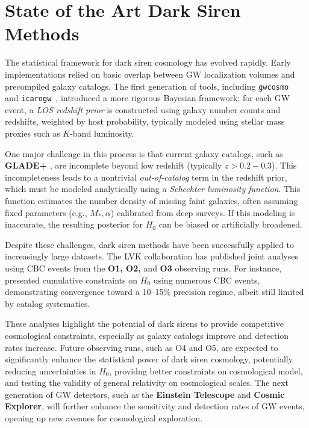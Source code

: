 \section{State of the Art Dark Siren Methods}
The statistical framework for dark siren cosmology has evolved rapidly. Early implementations relied on basic overlap between GW localization volumes and precompiled galaxy catalogs. The first generation of tools, including \texttt{gwcosmo}~\citep{gray2020cosmological, gray2022pixelated, gray2023joint} and \texttt{icarogw}~\citep{mastrogiovanni2021importance, mastrogiovanni2024icarogw}, introduced a more rigorous Bayesian framework: for each \ac{GW} event, a \textit{\ac{LOS} redshift prior} is constructed using galaxy number counts and redshifts, weighted by host probability, typically modeled using stellar mass proxies such as $K$-band luminosity.

One major challenge in this process is that current galaxy catalogs, such as \textbf{GLADE+} \citep{dalya2022glade+}, are incomplete beyond low redshift (typically $ z > 0.2 - 0.3$). This incompleteness leads to a nontrivial \textit{out-of-catalog} term in the redshift prior, which must be modeled analytically using a \textit{Schechter luminosity function}. This function estimates the number density of missing faint galaxies, often assuming fixed parameters (e.g., $M_*,\alpha$) calibrated from deep surveys. If this modeling is inaccurate, the resulting posterior for $H_0$ can be biased or artificially broadened.

Despite these challenges, dark siren methods have been successfully applied to increasingly large datasets. The \ac{LVK} collaboration has published joint analyses using \ac{CBC} events from the \textbf{O1, O2,} and \textbf{O3} observing runs. For instance,~\cite{abbott2021gravitational, abbott2023constraints} presented cumulative constraints on $H_0$ using numerous \ac{CBC} events, demonstrating convergence toward a 10--15\% precision regime, albeit still limited by catalog systematics.

These analyses highlight the potential of dark sirens to provide competitive cosmological constraints, especially as galaxy catalogs improve and detection rates increase. Future observing runs, such as O4 and O5, are expected to significantly enhance the statistical power of dark siren cosmology, potentially reducing uncertainties in $H_0$, providng better constraints on cosmological model, and testing the validity of general relativity on cosmological scales. The next generation of \ac{GW} detectors, such as the \textbf{Einstein Telescope} and \textbf{Cosmic Explorer}, will further enhance the sensitivity and detection rates of \ac{GW} events, opening up new avenues for cosmological exploration.

